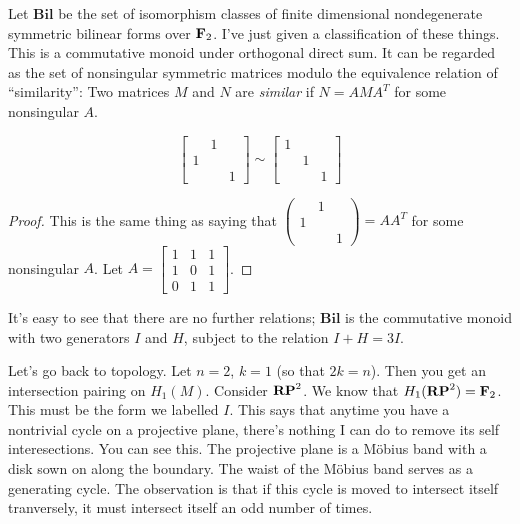 Let $\mathbf{Bil}$ be the set of isomorphism classes of finite dimensional 
nondegenerate symmetric bilinear forms over $\mathbf F_2$. I've just given a classification of these things. This is a commutative monoid under orthogonal
direct sum. It can be
regarded as the set of nonsingular symmetric matrices modulo the equivalence
relation of ``similarity'': Two matrices $M$ and $N$ are {\em similar} if  
$N=AMA^T$ for some nonsingular $A$.
\begin{claim}
\begin{equation*}
\left[\begin{array}{ccc}
 & 1 & \\
1 & & \\
 & & 1
\end{array}\right]
\sim
\left[\begin{array}{ccc}
1 & & \\
& 1 & \\
& & 1
\end{array}\right]
\end{equation*}
\end{claim}
\begin{proof}
This is the same thing as saying that $\begin{pmatrix}
 & 1 & \\
1 & & \\
 & & 1
\end{pmatrix}=AA^T$ for some nonsingular $A$. Let 
$
A=\left[\begin{array}{ccc}1&1&1 \\ 1&0&1 \\ 0&1&1 \end{array}\right]$.
\end{proof}
It's easy to see that there are no further relations; 
$\mathbf{Bil}$ is the commutative monoid with two generators $I$ and $H$, 
subject to the relation $I+H=3I$. 

Let's go back to topology. Let $n=2$, $k=1$ (so that $2k=n$). Then you get an intersection pairing on $ H_1(M)$. Consider $\mathbf{RP}^2$. We know that $ H_1(\mathbf{RP}^2)=\mathbf F_2$. This must be the form we labelled $I$. This says that anytime you have a nontrivial cycle on a projective plane, there's nothing I can do to remove its self interesections. You can see this. The projective plane is a M\"obius band with a 
disk sown on along the boundary. The waist of the M\"obius band serves as a
generating cycle. The observation is that if this cycle is moved to intersect 
itself tranversely, it must intersect itself an odd number of times. 

